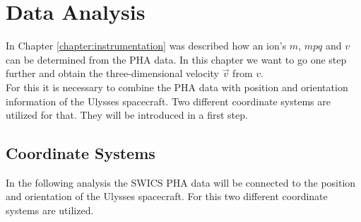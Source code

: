 
\chapter{Data Analysis} %

\label{chapter:data} 



In Chapter \ref{chapter:instrumentation} was described how an ion's $m$, $mpq$ and $v$ can be determined from the PHA data. In this chapter we want to go one step further and obtain the three-dimensional velocity $\vec{v}$ from $v$. \\
For this it is necessary to combine the PHA data with position and orientation information of the Ulysses spacecraft.
Two different coordinate systems are utilized for that. They will be introduced in a first step.


\section{Coordinate Systems}
\label{sec:cs}
In the following analysis the SWICS PHA data will be connected to the position and orientation of the Ulysses spacecraft. For this two different coordinate systems are utilized.

%
